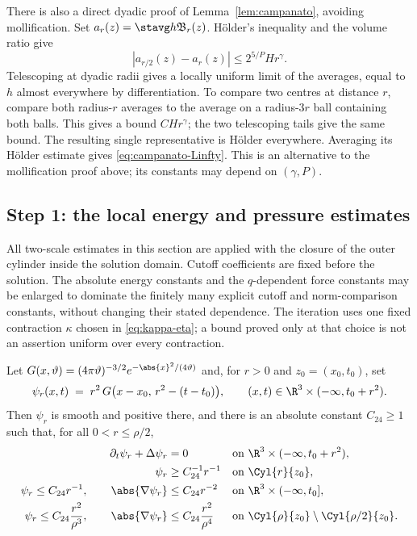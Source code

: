 \documentclass[11pt,reqno]{amsart}
\begin{document}
\begin{remark}
There is also a direct dyadic proof of Lemma~\ref{lem:campanato}, avoiding
mollification. Set $a_r(z)=\stavg h{\mathfrak B_r(z)}$.
H\"older's inequality and the volume ratio give
\[
 |a_{r/2}(z)-a_r(z)|\le 2^{5/P}H r^\gamma .
\]
Telescoping at dyadic radii gives a locally uniform limit of the averages,
equal to $h$ almost everywhere by differentiation. To compare two centres
at distance $r$, compare both radius-$r$ averages to the average on a
radius-$3r$ ball containing both balls. This gives a bound $CHr^\gamma$;
the two telescoping tails give the same bound. The resulting single
representative is H\"older everywhere. Averaging its H\"older estimate
gives \eqref{eq:campanato-Linfty}. This is an alternative to the
mollification proof above; its constants may depend on $(\gamma,P)$.
\end{remark}

\subsection{Step 1: the local energy and pressure estimates}\label{ss:step1}

All two-scale estimates in this section are applied with the closure of
the outer cylinder inside the solution domain. Cutoff coefficients are
fixed before the solution. The absolute energy constants and the
$q$-dependent force constants may be enlarged to dominate the finitely
many explicit cutoff and norm-comparison constants, without changing
their stated dependence. The iteration uses one fixed contraction
$\kappa$ chosen in \eqref{eq:kappa-eta}; a bound proved only at that
choice is not an assertion uniform over every contraction.

\begin{lemma}\label{lem:gaussian}
Let $G(x,\vartheta)=(4\pi\vartheta)^{-3/2}e^{-\abs{x}^{2}/(4\vartheta)}$ and, for
$r>0$ and $z_{0}=(x_{0},t_{0})$, set
\begin{equation}\label{eq:psi-r}
  \psi_{r}(x,t)\;=\;r^{2}\,G\bigl(x-x_{0},\,r^{2}-(t-t_{0})\bigr),
  \qquad (x,t)\in\R^{3}\times(-\infty,t_{0}+r^{2}).
\end{equation}
Then $\psi_{r}$ is smooth and positive there, and there is an absolute constant
$C_{24}\ge1$ such that, for all $0<r\le\rho/2$,
\begin{align}
  \partial_{t}\psi_{r}+\Delta\psi_{r}&=0
    &&\text{on }\R^{3}\times(-\infty,t_{0}+r^{2}),
    \label{eq:psi-backward}\\
  \psi_{r}&\ge C_{24}^{-1}r^{-1} &&\text{on }\Cyl{r}{z_{0}},
    \label{eq:psi-lower}\\
  \psi_{r}\le C_{24}r^{-1},\qquad
  \abs{\nabla\psi_{r}}&\le C_{24}r^{-2}
    &&\text{on }\R^{3}\times(-\infty,t_{0}],
    \label{eq:psi-upper}\\
  \psi_{r}\le C_{24}\frac{r^{2}}{\rho^{3}},\qquad
  \abs{\nabla\psi_{r}}&\le C_{24}\frac{r^{2}}{\rho^{4}}
    &&\text{on }\Cyl{\rho}{z_{0}}\setminus\Cyl{\rho/2}{z_{0}} .
    \label{eq:psi-far}
\end{align}
\end{lemma}
\end{document}
